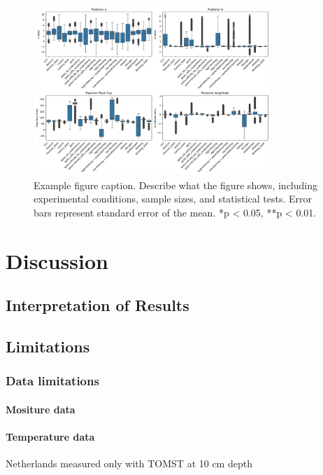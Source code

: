 \documentclass[12pt,a4paper]{article}
\begin{document}
\begin{figure}[H]
    \centering
    \includegraphics[width=0.8\textwidth]{"../other_params.png"}
    \caption{Example figure caption. Describe what the figure shows, including experimental conditions, sample sizes, and statistical tests. Error bars represent standard error of the mean. *p < 0.05, **p < 0.01.}
    \label{fig:other_params}
\end{figure}



\section{Discussion}

\subsection{Interpretation of Results}


\subsection{Limitations}

\subsubsection{Data limitations}

\paragraph{Mositure data}


\paragraph{Temperature data}
Netherlands measured only with TOMST at 10 cm depth
\end{document}

